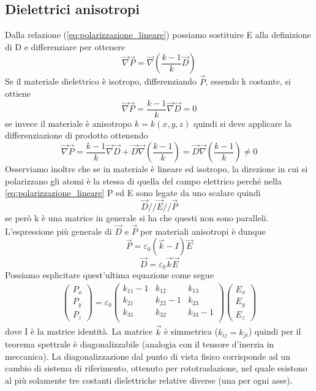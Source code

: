 \documentclass[10pt,a4paper]{article}
\begin{document}
\subsection{Dielettrici anisotropi}
Dalla relazione (\ref{eq:polarizzazione_lineare}) possiamo sostituire E alla definizione di D e differenziare per ottenere
\[\vec{\nabla}\vec{P} = \vec{\nabla}\left(\frac{k-1}{k}\vec{D}\right)\]
Se il materiale dielettrico è isotropo, differenziando $\vec{P}$, essendo k costante, si ottiene 
\[\vec{\nabla}\vec{P} = \frac{k-1}{k}\vec{\nabla}\vec{D} = 0\] 
se invece il materiale è anisotropo \(k=k(x,y,z)\) quindi si deve applicare la differenziazione di prodotto ottenendo
\[\vec{\nabla}\vec{P} = \frac{k-1}{k}\vec{\nabla}\vec{D} + \vec{D}\vec{\nabla}\left(\frac{k-1}{k}\right)= \vec{D}\vec{\nabla}\left(\frac{k-1}{k}\right)\neq 0\]
Osserviamo inoltre che se in materiale è lineare ed isotropo, la direzione in cui si polarizzano gli atomi è la stessa di quella del campo elettrico perché nella \ref{eq:polarizzazione_lineare} P ed E sono legate da uno scalare quindi
\[\vec{D}//\vec{E}//\vec{P}\]
se però k è una matrice in generale si ha che questi non sono paralleli. L'espressione più generale di $\vec{D}$ e $\vec{P}$ per materiali anisotropi è dunque
\[\vec{P} = \varepsilon_0 (\vec{k}-I)\vec{E}\]
\[\vec{D} = \varepsilon_0\vec{k}\vec{E}\]
Possiamo esplicitare quest'ultima equazione come segue
\begin{align*}
	\begin{pmatrix}
	P_x\\
	P_y\\
	P_z
	\end{pmatrix}
=\varepsilon_0
	\begin{pmatrix}
		k_{11}-1&k_{12}&k_{13}\\
		k_{21}&k_{22}-1&k_{23}\\
		k_{31}&k_{32}&k_{33}-1\\
	\end{pmatrix}
	\begin{pmatrix}
		E_x\\
		E_y\\
		E_z
	\end{pmatrix}
\end{align*}
dove I è la matrice identità. La matrice $\vec{k}$ è simmetrica (\(k_{ij} = k_{ji}\)) quindi per il teorema spettrale è diagonalizzabile (analogia con il tensore d'inerzia in meccanica). La diagonalizzazione dal punto di vista fisico corrisponde ad un cambio di sistema di riferimento, ottenuto per rototraslazione, nel quale esistono al più solamente tre costanti dielettriche relative diverse (una per ogni asse).
\end{document}
